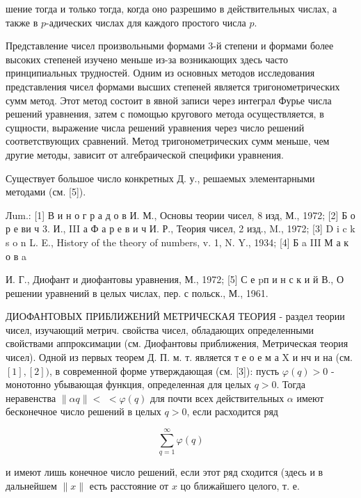 \documentclass[10pt]{article}
\begin{document}
шение тогда и только тогда, когда оно разрешимо в действительных числах, а также в $p$-адических числах для каждого простого числа $p$.



Представление чисел произвольными формами 3-й степени и формами более высоких степеней изучено меньше из-за возникающих здесь часто принципиальных трудностей. Одним из основных методов исследования представления чисел формами высших степеней является тригонометрических сумм метод. Этот метод состоит в явной записи через интеграл Фурье числа решений уравнения, затем с помощью кругового метода осуществляется, в сущности, выражение числа решений уравнения через число решений соответствующих сравнений. Метод тригонометрических сумм меньше, чем другие методы, зависит от алгебраической специфики уравнения.



Существует большое число конкретных Д. у., решаемых элементарными методами (см. [5]).



Лum.: [1] В и н о г р а д о в И. М., Основы теории чисел, 8 изд, М., 1972; [2] Б о р е ви ч 3. И., III а Ф а р е в и ч И. Р., Теория чисел, 2 изд., M., 1972; [3] D i c k s o n L. E., History of the theory of numbers, v. 1, N. Y., 1934; [4] Б a III М а к о в a

И. Г., Диофант и диофантовы уравнения, М., 1972; [5] С е pп и н с к и й В., О решении уравнений в целых числах, пер. с польск., М., 1961.



ДИОФАНТОВЫХ ПРИБЛИЖЕНИЙ МЕТРИЧЕСКАЯ ТЕОРИЯ - раздел теории чисел, изучающий метрич. свойства чисел, обладающих определенными свойствами аппроксимации (см. Диофантовы приближения, Метрическая теория чисел). Одной из первых теорем Д. П. м. т. является т е о е м а X и нч и на (см. $[1],[2])$, в современной форме утверждающая (см. [3]): пусть $\varphi(q)>0$ - монотонно убывающая функция, определенная для целых $q>0$. Тогда неравенства $\|\alpha q\|<$ $<\varphi(q)$ для почти всех действительных $\alpha$ имеют бесконечное число решений в целых $q>0$, если расходится ряд



\[

\sum_{q=1}^{\infty} \varphi(q)

\]



и имеют лишь конечное число решений, если этот ряд сходится (здесь и в дальнейшем $\|x\|$ есть расстояние от $x$ цо ближайшего целого, т. е.
\end{document}
